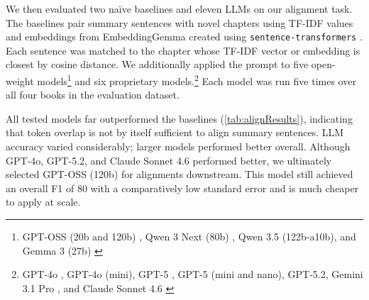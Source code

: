 \documentclass{article} %
\begin{document}
We then evaluated two na\"ive baselines and eleven LLMs on our alignment task. The baselines pair summary sentences with novel chapters using TF-IDF values \citep{scikit-learn} and embeddings from EmbeddingGemma \citep{vera2025embeddinggemmapowerfullightweighttext} created using \texttt{sentence-transformers} \citep{reimers-2019-sentence-bert}. Each sentence was matched to the chapter whose TF-IDF vector or embedding is closest by cosine distance. We additionally applied the prompt to five open-weight models\footnote{GPT-OSS (20b and 120b) \citep{openai2025gptoss120bgptoss20bmodel}, Qwen 3 Next (80b) \citep{qwen3.5}, Qwen 3.5 (122b-a10b), and Gemma 3 (27b) \citep{gemmateam2025gemma3technicalreport}} and six proprietary models.\footnote{GPT-4o \citep{openai2024gpt4ocard}, GPT-4o (mini), GPT-5 \citep{singh2025openaigpt5card}, GPT-5 (mini and nano), GPT-5.2, Gemini 3.1 Pro \citep{GeminiTeam2026Gemini31Pro}, and Claude Sonnet 4.6 \citep{Anthropic2025Claude4SystemCard}} Each model was run five times over all four books in the evaluation dataset.

All tested models far outperformed the baselines (\cref{tab:alignResults}), indicating that token overlap is not by itself sufficient to align summary sentences. LLM accuracy varied considerably; larger models performed better overall. Although GPT-4o, GPT-5.2, and Claude Sonnet 4.6 performed better, we ultimately selected GPT-OSS (120b) for alignments downstream. This model still achieved an overall F1 of 80 with a comparatively low standard error and is much cheaper to apply at scale.
\end{document}
